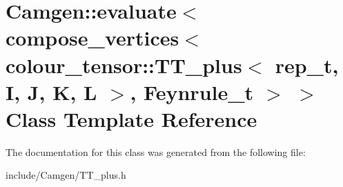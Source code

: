 \hypertarget{a00179}{}\section{Camgen\+:\+:evaluate$<$ compose\+\_\+vertices$<$ colour\+\_\+tensor\+:\+:T\+T\+\_\+plus$<$ rep\+\_\+t, I, J, K, L $>$, Feynrule\+\_\+t $>$ $>$ Class Template Reference}
\label{a00179}


The documentation for this class was generated from the following file\+:\begin{DoxyCompactItemize}
\item 
include/\+Camgen/T\+T\+\_\+plus.\+h\end{DoxyCompactItemize}
